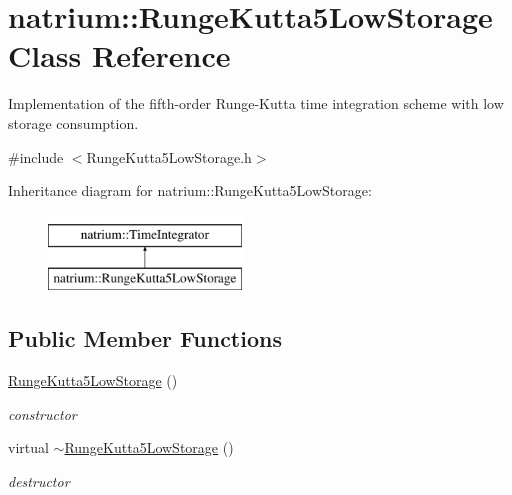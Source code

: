 \hypertarget{classnatrium_1_1RungeKutta5LowStorage}{\section{natrium\-:\-:\-Runge\-Kutta5\-Low\-Storage \-Class \-Reference}
\label{classnatrium_1_1RungeKutta5LowStorage}
}


\-Implementation of the fifth-\/order \-Runge-\/\-Kutta time integration scheme with low storage consumption.  




{\ttfamily \#include $<$\-Runge\-Kutta5\-Low\-Storage.\-h$>$}

\-Inheritance diagram for natrium\-:\-:\-Runge\-Kutta5\-Low\-Storage\-:\begin{figure}[H]
\begin{center}
\leavevmode
\includegraphics[height=2.000000cm]{classnatrium_1_1RungeKutta5LowStorage}
\end{center}
\end{figure}
\subsection*{\-Public \-Member \-Functions}
\begin{DoxyCompactItemize}
\item 
\hypertarget{classnatrium_1_1RungeKutta5LowStorage_adcb00ef16369158a395ecb54e5d5f91e}{\hyperlink{classnatrium_1_1RungeKutta5LowStorage_adcb00ef16369158a395ecb54e5d5f91e}{\-Runge\-Kutta5\-Low\-Storage} ()}\label{classnatrium_1_1RungeKutta5LowStorage_adcb00ef16369158a395ecb54e5d5f91e}

\begin{DoxyCompactList}\small\item\em constructor \end{DoxyCompactList}\item 
\hypertarget{classnatrium_1_1RungeKutta5LowStorage_a0d0e4591d2b671f450029bb3ba3053de}{virtual \hyperlink{classnatrium_1_1RungeKutta5LowStorage_a0d0e4591d2b671f450029bb3ba3053de}{$\sim$\-Runge\-Kutta5\-Low\-Storage} ()}\label{classnatrium_1_1RungeKutta5LowStorage_a0d0e4591d2b671f450029bb3ba3053de}

\begin{DoxyCompactList}\small\item\em destructor \end{DoxyCompactList}\end{DoxyCompactItemize}


